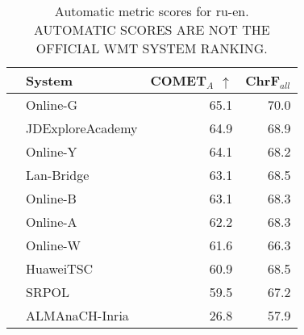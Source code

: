 \begin{table}
\centering
\caption{Automatic metric scores for ru-en. \\AUTOMATIC SCORES ARE NOT THE OFFICIAL WMT SYSTEM RANKING.}
\begin{tabular}{llrr}
\toprule
          &            System &  COMET$_{A}$ $\uparrow$ &  ChrF$_{all}$ \\
\midrule
 \Uncon{} &          Online-G &                    65.1 &          70.0 \\
 \Const{} &  JDExploreAcademy &                    64.9 &          68.9 \\
 \Uncon{} &          Online-Y &                    64.1 &          68.2 \\
 \Uncon{} &        Lan-Bridge &                    63.1 &          68.5 \\
 \Uncon{} &          Online-B &                    63.1 &          68.3 \\
 \Uncon{} &          Online-A &                    62.2 &          68.3 \\
 \Uncon{} &          Online-W &                    61.6 &          66.3 \\
 \Const{} &         HuaweiTSC &                    60.9 &          68.5 \\
 \Const{} &             SRPOL &                    59.5 &          67.2 \\
 \Const{} &    ALMAnaCH-Inria &                    26.8 &          57.9 \\
\bottomrule
\end{tabular}
\end{table}



